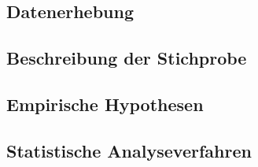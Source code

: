 \subsection{Datenerhebung}
\subsection{Beschreibung der Stichprobe}
\subsection{Empirische Hypothesen}\label{sec:EmpirischeHypothesen}
\subsection{Statistische Analyseverfahren}